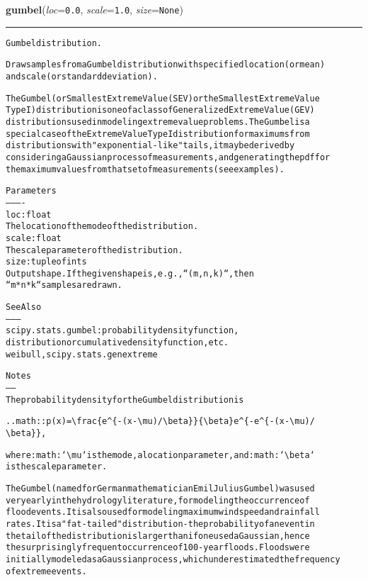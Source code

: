 \hspace{.8\funcindent}\begin{boxedminipage}{\funcwidth}

    \raggedright \textbf{gumbel}(\textit{loc}={\tt 0.0}, \textit{scale}={\tt 1.0}, \textit{size}={\tt None})

    \vspace{-1.5ex}

    \rule{\textwidth}{0.5\fboxrule}
\setlength{\parskip}{2ex}
\begin{alltt}
Gumbel distribution.

Draw samples from a Gumbel distribution with specified location (or mean)
and scale (or standard deviation).

The Gumbel (or Smallest Extreme Value (SEV) or the Smallest Extreme Value
Type I) distribution is one of a class of Generalized Extreme Value (GEV)
distributions used in modeling extreme value problems.  The Gumbel is a
special case of the Extreme Value Type I distribution for maximums from
distributions with "exponential-like" tails, it may be derived by
considering a Gaussian process of measurements, and generating the pdf for
the maximum values from that set of measurements (see examples).

Parameters
----------
loc : float
    The location of the mode of the distribution.
scale : float
    The scale parameter of the distribution.
size : tuple of ints
    Output shape.  If the given shape is, e.g., ``(m, n, k)``, then
    ``m * n * k`` samples are drawn.

See Also
--------
scipy.stats.gumbel : probability density function,
    distribution or cumulative density function, etc.
weibull, scipy.stats.genextreme

Notes
-----
The probability density for the Gumbel distribution is

.. math:: p(x) = {\textbackslash}frac\{e{\textasciicircum}\{-(x - {\textbackslash}mu)/ {\textbackslash}beta\}\}\{{\textbackslash}beta\} e{\textasciicircum}\{ -e{\textasciicircum}\{-(x - {\textbackslash}mu)/
          {\textbackslash}beta\}\},

where :math:`{\textbackslash}mu` is the mode, a location parameter, and :math:`{\textbackslash}beta`
is the scale parameter.

The Gumbel (named for German mathematician Emil Julius Gumbel) was used
very early in the hydrology literature, for modeling the occurrence of
flood events. It is also used for modeling maximum wind speed and rainfall
rates.  It is a "fat-tailed" distribution - the probability of an event in
the tail of the distribution is larger than if one used a Gaussian, hence
the surprisingly frequent occurrence of 100-year floods. Floods were
initially modeled as a Gaussian process, which underestimated the frequency
of extreme events.


\end{alltt}
\end{boxedminipage}

